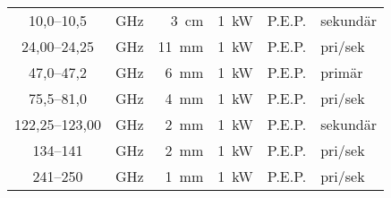 \begin{table*}[b!]
\begin{tabular}{clr|rl|l}
10,0--10,5 & GHz & 3~cm & 1~kW & P.E.P. & sekundär\\
24,00--24,25 & GHz & 11~mm & 1~kW & P.E.P. & pri/sek\\
47,0--47,2 & GHz & 6~mm & 1~kW & P.E.P. & primär\\
75,5--81,0 & GHz & 4~mm & 1~kW & P.E.P. & pri/sek\\
122,25--123,00 & GHz & 2~mm & 1~kW & P.E.P. & sekundär\\
134--141 & GHz & 2~mm & 1~kW & P.E.P. & pri/sek\\
241--250 & GHz & 1~mm & 1~kW & P.E.P. & pri/sek\\
\end{tabular}
\end{table*}

